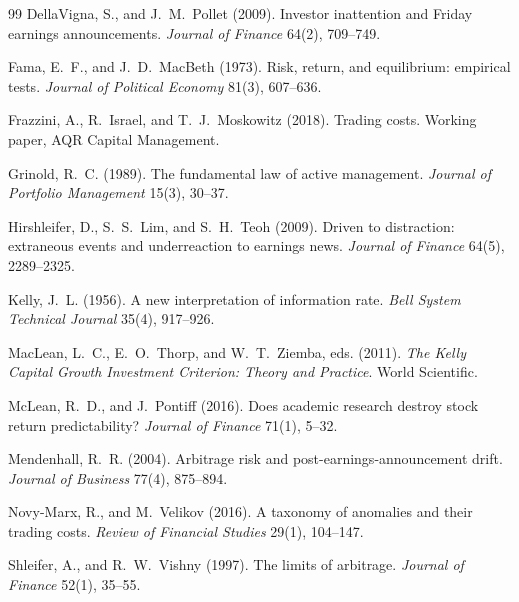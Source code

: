 \documentclass[11pt]{article}
\theoremstyle{definition}
\newcommand{\1}{\mathbf{1}}
\begin{document}
\begin{thebibliography}{99}
DellaVigna, S., and J.~M.~Pollet (2009). Investor inattention and Friday earnings
announcements. \textit{Journal of Finance} 64(2), 709--749.

Fama, E.~F., and J.~D.~MacBeth (1973). Risk, return, and equilibrium: empirical tests.
\textit{Journal of Political Economy} 81(3), 607--636.

Frazzini, A., R.~Israel, and T.~J.~Moskowitz (2018). Trading costs. Working paper, AQR
Capital Management.

Grinold, R.~C. (1989). The fundamental law of active management. \textit{Journal of
Portfolio Management} 15(3), 30--37.

Hirshleifer, D., S.~S.~Lim, and S.~H.~Teoh (2009). Driven to distraction: extraneous events
and underreaction to earnings news. \textit{Journal of Finance} 64(5), 2289--2325.

Kelly, J.~L. (1956). A new interpretation of information rate. \textit{Bell System
Technical Journal} 35(4), 917--926.

MacLean, L.~C., E.~O.~Thorp, and W.~T.~Ziemba, eds. (2011). \textit{The Kelly Capital Growth
Investment Criterion: Theory and Practice}. World Scientific.

McLean, R.~D., and J.~Pontiff (2016). Does academic research destroy stock return
predictability? \textit{Journal of Finance} 71(1), 5--32.

Mendenhall, R.~R. (2004). Arbitrage risk and post-earnings-announcement drift.
\textit{Journal of Business} 77(4), 875--894.

Novy-Marx, R., and M.~Velikov (2016). A taxonomy of anomalies and their trading costs.
\textit{Review of Financial Studies} 29(1), 104--147.

Shleifer, A., and R.~W.~Vishny (1997). The limits of arbitrage. \textit{Journal of
Finance} 52(1), 35--55.
\end{thebibliography}
\end{document}
